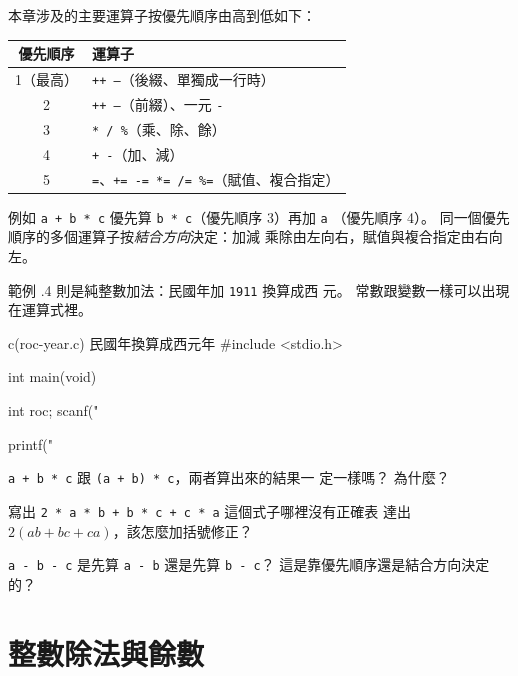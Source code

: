 本章涉及的主要運算子按優先順序由高到低如下：

\begin{center}
\begin{tabular}{cl}
優先順序 & 運算子 \\
\hline
1（最高） & \texttt{++ --}（後綴、單獨成一行時） \\
2 & \texttt{++ --}（前綴）、一元 \texttt{-} \\
3 & \texttt{* / \%}（乘、除、餘） \\
4 & \texttt{+ -}（加、減） \\
5 & \texttt{=}、\texttt{+= -= *= /= \%=}（賦值、複合指定） \\
\end{tabular}
\end{center}

例如 \texttt{a + b * c} 優先算 \texttt{b * c}（優先順序 3）再加 \texttt{a}
（優先順序 4）。 同一個優先順序的多個運算子按\emph{結合方向}決定：加減
乘除由左向右，賦值與複合指定由右向左。


範例 \thechapter.4 則是純整數加法：民國年加 \texttt{1911} 換算成西
元。 常數跟變數一樣可以出現在運算式裡。

\begin{example}{c}{(roc-year.c) 民國年換算成西元年}
#include <stdio.h>

int main(void) {
    int roc;
    scanf("%

    printf("%
}
\end{example}


\begin{drills}[label=drills:arith-operators]
\item \texttt{a + b * c} 跟 \texttt{(a + b) * c}，兩者算出來的結果一
定一樣嗎？ 為什麼？
\item 寫出 \texttt{2 * a * b + b * c + c * a} 這個式子哪裡沒有正確表
達出 $2(ab+bc+ca)$，該怎麼加括號修正？
\item \texttt{a - b - c} 是先算 \texttt{a - b} 還是先算 \texttt{b - c}？
這是靠優先順序還是結合方向決定的？
\end{drills}

\section{整數除法與餘數}
\label{sec:arith-intdiv}

